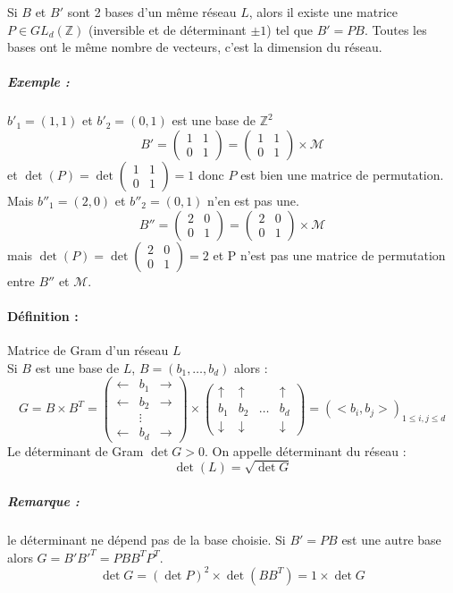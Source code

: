 \documentclass[12pt,a4paper]{report}
\begin{document}
Si $B$ et $B'$ sont 2 bases d'un même réseau $L$, alors il existe une matrice $P \in GL_d(\mathbb{Z})$ (inversible et de déterminant $\pm 1$) tel que $B' = PB$. Toutes les bases ont le même nombre de vecteurs, c'est la dimension du réseau. 
\subparagraph{Exemple :} $b'_1=(1,1)$ et $b'_2 = (0,1)$ est une base de $\mathbb{Z}^2$\\
$$B'=\left(\begin{array}{cc}
1 & 1 \\ 0 & 1 \end{array}\right) = \left(\begin{array}{cc}
1 & 1 \\ 0 & 1 \end{array}\right) \times \mathcal{M} $$
et $\det(P) = \det \left(\begin{array}{cc}
1 & 1 \\ 0 & 1 \end{array}\right) = 1 $ donc $P$ est bien une matrice de permutation.\\
Mais $b''_1 = (2,0)$ et $b''_2 = (0,1)$ n'en est pas une.
$$ B''=\left(\begin{array}{cc}
2 & 0 \\ 0 & 1 \end{array}\right) = \left(\begin{array}{cc}
2 & 0 \\ 0 & 1 \end{array}\right)\times \mathcal{M} $$ mais $\det(P) = \det \left(\begin{array}{cc}
2 & 0 \\ 0 & 1 \end{array}\right) = 2$ et P n'est pas une matrice de permutation entre $B''$ et $\mathcal{M}$.
\paragraph{Définition :} Matrice de Gram d'un réseau $L$\\
Si $B$ est une base de $L$, $B=(b_1,\ldots,b_d)$ alors :
$$ G = B\times B^T = \left(\begin{array}{ccc}
\leftarrow & b_1 & \rightarrow \\
\leftarrow & b_2 & \rightarrow \\
 & \vdots & \\
\leftarrow & b_d & \rightarrow \end{array}\right) \times 
\left( \begin{array}{cccc}
\uparrow & \uparrow &  & \uparrow \\
b_1 & b_2 & \ldots & b_d \\
\downarrow & \downarrow & & \downarrow \end{array}\right) = \left( <b_i,b_j> \right)_{1 \leqslant i,j \leqslant d} $$
Le déterminant de Gram $\det G > 0$. On appelle déterminant du réseau :
$$\det (L) = \sqrt{\det G} $$
\subparagraph{Remarque :} le déterminant ne dépend pas de la base choisie.
Si $B'=PB$ est une autre base alors $G=B'B'^T = PBB^TP^T$.
$$ \det G = (\det P)^2 \times \det(BB^T) = 1\times \det G $$
\end{document}
